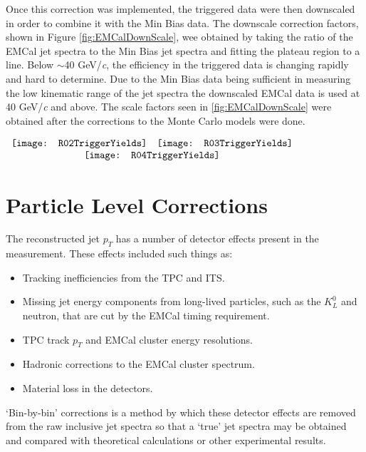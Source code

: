 Once this correction was implemented, the triggered data were then downscaled in order to combine it with the Min Bias data.  The downscale correction factors, shown in Figure \ref{fig:EMCalDownScale}, wee obtained by taking the ratio of the EMCal jet spectra to the Min Bias jet spectra and fitting the plateau region to a line.  Below $\sim$40 GeV/\textit{c}, the efficiency in the triggered data is changing rapidly and hard to determine.  Due to the Min Bias data being sufficient in measuring the low kinematic range of the jet spectra the downscaled EMCal data is used at 40 GeV/\textit{c} and above.  The scale factors seen in \ref{fig:EMCalDownScale} were obtained after the corrections to the Monte Carlo models were done.


\begin{figure*}[t!]
$\begin{array}{rl}
    \texttt{[image: R02TriggerYields]} &
    \texttt{[image: R03TriggerYields]}\\
    \multicolumn{2}{c}{\texttt{[image: R04TriggerYields]}}
\end{array}$
\caption[EMCal triggered data correction factors for R=0.2, R=0.3, and R=0.4 jets.]{\label{fig:EMCalDownScale}EMCal triggered data correction factors for R=0.2, R=0.3, and R=0.4 jets.}
\end{figure*}
 

\section{Particle Level Corrections}

The reconstructed jet $p_{T}$ has a number of detector effects present in the measurement.  These effects included such things as:

\begin{itemize}
\item Tracking inefficiencies from the TPC and ITS.
\item Missing jet energy components from long-lived particles, such as the $K^{0}_{L}$ and neutron, that are cut by the EMCal timing requirement.
\item TPC track $p_{T}$ and EMCal cluster energy resolutions.
\item Hadronic corrections to the EMCal cluster spectrum.
\item Material loss in the detectors.
\end{itemize}

\noindent
`Bin-by-bin' corrections is a method by which these detector effects are removed from the raw inclusive jet spectra so that a `true' jet spectra may be obtained and compared with theoretical calculations or other experimental results.  

